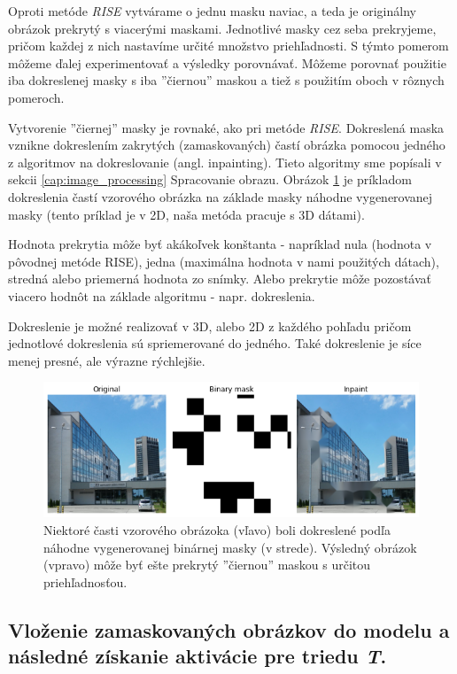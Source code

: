 Oproti metóde \textit{RISE} vytvárame o jednu masku naviac, a teda je originálny obrázok prekrytý s viacerými maskami. Jednotlivé masky cez seba prekryjeme, pričom každej z nich nastavíme určité množstvo priehľadnosti. S týmto pomerom môžeme ďalej experimentovať a výsledky porovnávať. Môžeme porovnať použitie iba dokreslenej masky s iba ''čiernou'' maskou a tiež s použitím oboch v rôznych pomeroch.

Vytvorenie ''čiernej'' masky je rovnaké, ako pri metóde \textit{RISE}. Dokreslená maska vznikne dokreslením zakrytých (zamaskovaných) častí obrázka pomocou jedného z algoritmov na dokreslovanie (angl. inpainting). Tieto algoritmy sme popísali v sekcii \ref{cap:image_processing} Spracovanie obrazu. Obrázok \ref{fig:risei_inpainting_example} je príkladom dokreslenia častí vzorového obrázka na základe masky náhodne vygenerovanej masky (tento príklad je v 2D, naša metóda pracuje s 3D dátami).

Hodnota prekrytia môže byť akákoľvek konštanta - napríklad nula (hodnota v pôvodnej metóde RISE), jedna (maximálna hodnota v nami použitých dátach), stredná alebo priemerná hodnota zo snímky. Alebo prekrytie môže pozostávať viacero hodnôt na základe algoritmu - napr. dokreslenia. 

Dokreslenie je možné realizovať v 3D, alebo 2D z každého pohľadu pričom jednotlové dokreslenia sú spriemerované do jedného. Také dokreslenie je síce menej presné, ale výrazne rýchlejšie.

\begin{figure}[h!]
    \centering
    \includegraphics[width=13cm]{assets/images/risei_inpainting_example.png}
    \caption{Niektoré časti vzorového obrázoka (vľavo) boli dokreslené podľa náhodne vygenerovanej binárnej masky (v strede). Výsledný obrázok (vpravo) môže byť ešte prekrytý ''čiernou'' maskou s určitou priehľadnosťou.}
    \label{fig:risei_inpainting_example}
\end{figure}

\subsection{Vloženie zamaskovaných obrázkov do modelu a následné získanie aktivácie pre triedu \textit{T}.}

